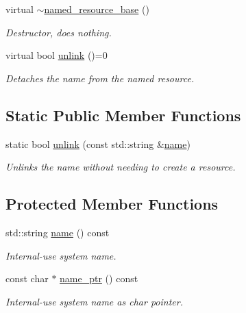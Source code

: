 \begin{DoxyCompactItemize}
\item 
\mbox{\label{classcpen333_1_1process_1_1impl_1_1named__resource__base_ae53d159d6c0d58a37ce8091aa132e11b}} 
virtual \hyperlink{classcpen333_1_1process_1_1impl_1_1named__resource__base_ae53d159d6c0d58a37ce8091aa132e11b}{$\sim$named\+\_\+resource\+\_\+base} ()
\begin{DoxyCompactList}\small\item\em Destructor, does nothing. \end{DoxyCompactList}\item 
virtual bool \hyperlink{classcpen333_1_1process_1_1impl_1_1named__resource__base_ae4033f82dfd068b917a9bca57d3a0c45}{unlink} ()=0
\begin{DoxyCompactList}\small\item\em Detaches the name from the named resource. \end{DoxyCompactList}\end{DoxyCompactItemize}
\subsection*{Static Public Member Functions}
\begin{DoxyCompactItemize}
\item 
static bool \hyperlink{classcpen333_1_1process_1_1impl_1_1named__resource__base_a47a1396cf7c8210e76431a4ba4725146}{unlink} (const std\+::string \&\hyperlink{classcpen333_1_1process_1_1impl_1_1named__resource__base_ae0c5fbb1843afe863cece4b51c38f807}{name})
\begin{DoxyCompactList}\small\item\em Unlinks the name without needing to create a resource. \end{DoxyCompactList}\end{DoxyCompactItemize}
\subsection*{Protected Member Functions}
\begin{DoxyCompactItemize}
\item 
std\+::string \hyperlink{classcpen333_1_1process_1_1impl_1_1named__resource__base_ae0c5fbb1843afe863cece4b51c38f807}{name} () const
\begin{DoxyCompactList}\small\item\em Internal-\/use system name. \end{DoxyCompactList}\item 
const char $\ast$ \hyperlink{classcpen333_1_1process_1_1impl_1_1named__resource__base_af4f2889b26cf33d0d5ed794b7e4097ab}{name\+\_\+ptr} () const
\begin{DoxyCompactList}\small\item\em Internal-\/use system name as char pointer. \end{DoxyCompactList}\end{DoxyCompactItemize}
